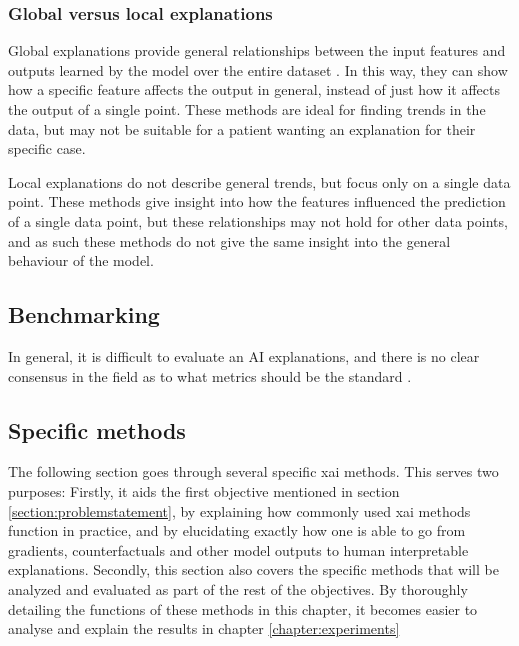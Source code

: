 \documentclass[UKenglish]{uiomasterthesis} %
\theoremstyle{definition}
\begin{document}
\subsubsection{Global versus local explanations}

Global explanations provide general relationships between the input features and outputs learned by the model over the entire dataset \cite{xaioverview}. In this way, they can show how a specific feature affects the output in general, instead of just how it affects the output of a single point. These methods are ideal for finding trends in the data, but may not be suitable for a patient wanting an explanation for their specific case.

Local explanations do not describe general trends, but focus only on a single data point. These methods give insight into how the features influenced the prediction of a single data point, but these relationships may not hold for other data points, and as such these methods do not give the same insight into the general behaviour of the model.




\subsection{Benchmarking}

In general, it is difficult to evaluate an AI explanations, and there is no clear consensus in the field as to what metrics should be the standard \cite{molnar, evalxai}.

\subsection{Specific methods}


The following section goes through several specific \ac{xai} methods. This serves two purposes: Firstly, it aids the first objective mentioned in section \ref{section:problemstatement}, by explaining how commonly used \ac{xai} methods function in practice, and by elucidating exactly how one is able to go from gradients, counterfactuals and other model outputs to human interpretable explanations. Secondly, this section also covers the specific methods that will be analyzed and evaluated as part of the rest of the objectives. By thoroughly detailing the functions of these methods in this chapter, it becomes easier to analyse and explain the results in chapter \ref{chapter:experiments}
\\
\end{document}
